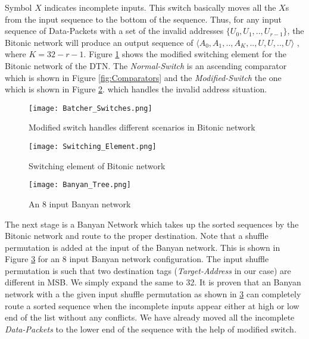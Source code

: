 					      Symbol $X$ indicates incomplete inputs. This switch basically moves all the $X$s from the input sequence to the bottom of the sequence.
					      Thus, for any input sequence of Data-Packets with a set of  the invalid addresses $\{U_{0},U_{1},..,U_{r-1}\}$, the Bitonic network will produce an output sequence of $\langle A_{0},A_{1},..,A_{K},..,U,U,..,U \rangle$ , where
					      $ K = 32 - r -1$. Figure \ref{fig:Batcher_Switches} shows the modified switching element for the Bitonic network of the DTN. The \textit{Normal-Switch} is an ascending comparator which is shown in Figure \ref{fig:Comparators} and
					      the \textit{Modified-Switch} the one which is shown in Figure \ref{fig:Switching_Element}. which handles the invalid address situation.
					      \begin{figure}[!ht]
						      \texttt{[image: Batcher\_Switches.png]}
						      \caption{Modified switch handles different scenarios in Bitonic network}
					      \label{fig:Batcher_Switches}
					      \end{figure}
					      \begin{figure}[!ht]
						      \texttt{[image: Switching\_Element.png]}
						      \caption{Switching element of Bitonic network}
					      \label{fig:Switching_Element}
					      \end{figure}
					      \begin{figure}[!ht]
						      \texttt{[image: Banyan\_Tree.png]}
						      \caption{An 8 input Banyan network}
					      \label{fig:Banyan_Tree}
					      \end{figure}
					      The next stage is a Banyan Network which takes up the sorted sequences by the Bitonic network and route to the proper destination. Note that a shuffle permutation is added at the input of the Banyan network.
					      This is shown in Figure \ref{fig:Banyan_Tree} for an 8 input Banyan network configuration. The input shuffle permutation is such that two destination tags (\textit{Target-Address} in our case) are different in MSB. We simply expand the same to 32. 
					      It is proven \cite{batcher_banyan_ref} that 
					      an Banyan network with a the given input shuffle permutation as shown in \ref{fig:Banyan_Tree} can completely route a sorted sequence when the incomplete inputs appear either at high or low end of the list without any conflicts. We have already moved all the incomplete \textit{Data-Packets}
					      to the lower end of the sequence with the help of modified switch. 
